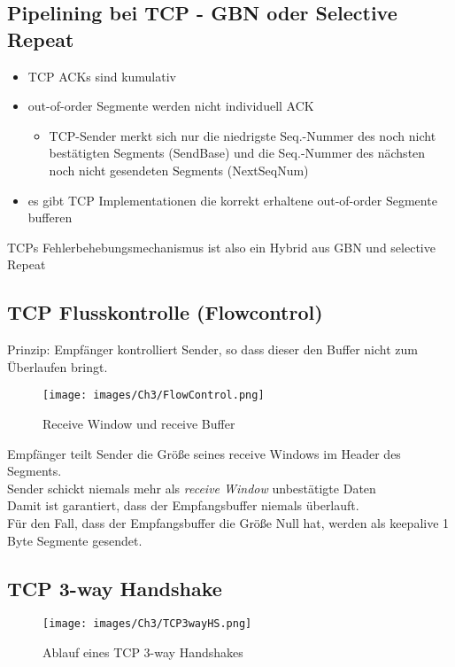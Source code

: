 \subsection{Pipelining bei TCP - GBN oder Selective Repeat}
\begin{itemize}
    \item TCP ACKs sind kumulativ
    \item out-of-order Segmente werden nicht individuell ACK
            \begin{itemize}
                \item TCP-Sender merkt sich nur die niedrigste Seq.-Nummer des noch nicht bestätigten Segments (SendBase) und die Seq.-Nummer des nächsten noch nicht gesendeten Segments (NextSeqNum)
            \end{itemize}
    \item es gibt TCP Implementationen die korrekt erhaltene out-of-order Segmente bufferen
\end{itemize}

\noindent TCPs Fehlerbehebungsmechanismus ist also ein Hybrid aus GBN und selective Repeat

\subsection{TCP Flusskontrolle (Flowcontrol)}
Prinzip: Empfänger kontrolliert Sender, so dass dieser den Buffer nicht zum Überlaufen bringt.


\begin{figure}[H]
    \centering
    \texttt{[image: images/Ch3/FlowControl.png]}
    \caption{Receive Window und receive Buffer}
    \label{Ch03-TCP-Flowcontrol}
\end{figure}
\noindent Empfänger teilt Sender die Größe seines receive Windows im Header des Segments.\\
\noindent Sender schickt niemals mehr als \textit{receive Window} unbestätigte Daten\\
\noindent Damit ist garantiert, dass der Empfangsbuffer niemals überlauft.\\
Für den Fall, dass der Empfangsbuffer die Größe Null hat, werden als keepalive 1 Byte Segmente gesendet.

\subsection{TCP 3-way Handshake}

\begin{figure}[H]
    \centering
    \texttt{[image: images/Ch3/TCP3wayHS.png]}
    \caption{Ablauf eines TCP 3-way Handshakes}
    \label{Ch03-TCP-HS}
\end{figure}

